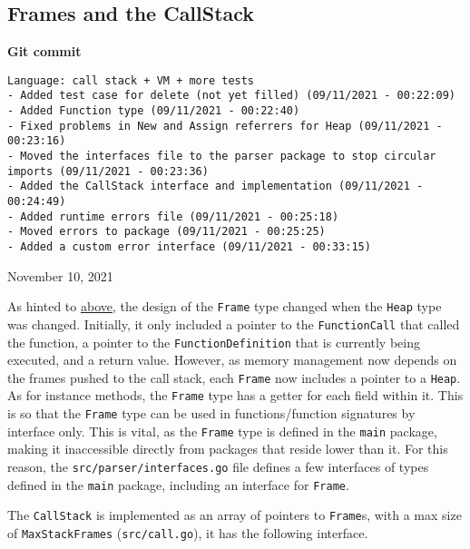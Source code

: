 \subsection{Frames and the CallStack}
\label{sec:data-structures-frames-callstack}

\begin{center}
    \textbf{Git commit}
    \begin{verbatim}
Language: call stack + VM + more tests
- Added test case for delete (not yet filled) (09/11/2021 - 00:22:09)
- Added Function type (09/11/2021 - 00:22:40)
- Fixed problems in New and Assign referrers for Heap (09/11/2021 - 00:23:16)
- Moved the interfaces file to the parser package to stop circular imports (09/11/2021 - 00:23:36)
- Added the CallStack interface and implementation (09/11/2021 - 00:24:49)
- Added runtime errors file (09/11/2021 - 00:25:18)
- Moved errors to package (09/11/2021 - 00:25:25)
- Added a custom error interface (09/11/2021 - 00:33:15)
    \end{verbatim}
    \vspace{-1em}
    \tiny{November 10, 2021}
\end{center}

As hinted to \hyperref[sec:data-structures-heap]{above}, the design of the \verb|Frame| type changed when the \verb|Heap| type was changed. Initially, it only included a pointer to the \verb|FunctionCall| that called the function, a pointer to the \verb|FunctionDefinition| that is currently being executed, and a return value. However, as memory management now depends on the frames pushed to the call stack, each \verb|Frame| now includes a pointer to a \verb|Heap|. As for instance methods, the \verb|Frame| type has a getter for each field within it. This is so that the \verb|Frame| type can be used in functions/function signatures by interface only. This is vital, as the \verb|Frame| type is defined in the \verb|main| package, making it inaccessible directly from packages that reside lower than it. For this reason, the \verb|src/parser/interfaces.go| file defines a few interfaces of types defined in the \verb|main| package, including an interface for \verb|Frame|.

The \verb|CallStack| is implemented as an array of pointers to \verb|Frame|s, with a max size of \verb|MaxStackFrames| (\verb|src/call.go|), it has the following interface.

\inputminted[firstline=62, lastline=73, autogobble, breaklines, tabsize=4]{go}{../../src/parser/interfaces.go}

